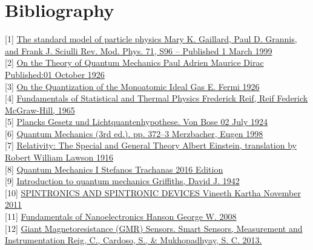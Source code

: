 \documentclass{article}
\begin{document}
\mbox{}
\vfill
\section{Bibliography}
\small
[1] \href{https://journals.aps.org/rmp/abstract/10.1103/RevModPhys.71.S96}{The standard model of particle physics
Mary K. Gaillard, Paul D. Grannis, and Frank J. Sciulli
Rev. Mod. Phys. 71, S96 – Published 1 March 1999}\\[0pt]
[2] \href{https://royalsocietypublishing.org/doi/pdf/10.1098/rspa.1926.0133}{On the Theory of Quantum Mechanics
Paul Adrien Maurice Dirac
Published:01 October 1926}\\[0pt]
[3] \href{https://arxiv.org/abs/cond-mat/9912229}{On the Quantization of the Monoatomic Ideal
Gas
E. Fermi
1926}\\[0pt]
[4] \href{https://books.google.com/books/about/Fundamentals_of_Statistical_and_Thermal.html?id=w5dRAAAAMAAJ&redir_esc=y}{Fundamentals of Statistical and Thermal Physics
Frederick Reif, Reif Federick
McGraw-Hill, 1965 }\\[0pt]
[5] \href{http://www.condmat.uni-oldenburg.de/TeachingSP/bose.ps}{Plancks Gesetz und Lichtquantenhypothese. 
Von Bose
02 July 1924}\\[0pt]
[6] \href{https://archive.org/details/quantummechanics00merz_136/page/n385/mode/2up}{Quantum Mechanics (3rd ed.). pp. 372–3
Merzbacher, Eugen
1998}\\[0pt]
[7]
\href{https://en.wikisource.org/wiki/Relativity:_The_Special_and_General_Theory}{Relativity: The Special and General Theory
Albert Einstein, translation by Robert William Lawson
1916}\\[0pt]
[8] \href{https://www.cup.gr/book/kvantomichaniki-i/}{ Quantum Mechanics I
Stefanos Trachanas
2016 Edition}\\[0pt]
[9] \href{https://archive.org/details/introductiontoqu00grif_190}{Introduction to quantum mechanics
Griffiths, David J.
1942}\\[0pt]
[10] \href{https://www.researchgate.net/publication/260103630_SPINTRONICS_AND_SPINTRONIC_DEVICES}{SPINTRONICS AND SPINTRONIC DEVICES
Vineeth Kartha
November 2011}\\[0pt]
[11] \href{https://books.google.com/books?redir_esc=y&id=L7AUi7ltCksC&focus=searchwithinvolume&q=Spintronics}{Fundamentals of Nanoelectronics
Hanson George W.
2008}\\[0pt]
[12] \href{https://www.springer.com/cn/book/9783642371714}{Giant Magnetoresistance (GMR) Sensors. Smart Sensors, Measurement and Instrumentation
Reig, C., Cardoso, S., \& Mukhopadhyay, S. C.
2013.}\\[0pt]
\end{document}

